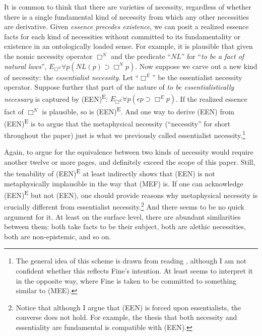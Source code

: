 \documentclass[12pt]{article}
\begin{document}
\par
It is common to think that there are varieties of necessity, regardless of whether there is a single fundamental kind of necessity from which any other necessities are derivative. Given \textit{essence precedes existence}, we can posit a realized essence facts for each kind of necessities without committed to its fundamentality or existence in an ontologically loaded sense. For example, it is plausible that given the nomic necessity operator $\Box^N$ and the predicate ``$NL$'' for ``\textit{to be a fact of natural laws}'', $E_{\Box^N} \forall p (NL(p) \supset \Box^N p)$. Now suppose we carve out a new kind of necessity: the \textit{essentialist necessity}. Let ``$\Box^E$'' be the essentialist necessity operator. Suppose further that part of the nature of \textit{to be essentialistically necessary} is captured by (EEN)\textsuperscript{E}: $E_{\Box^E} \forall p(\epsilon p \supset \Box^E p)$. If the realized essence fact of $\Box^N$ is plausible, so is (EEN)\textsuperscript{E}. And one way to derive (EEN) from (EEN)\textsuperscript{E} is to argue that the metaphysical necessity (``necessity'' for short throughout the paper) just is what we previously called essentialist necessity.\footnote{The general idea of this scheme is drawn from reading \citet[463--4]{Fine2020-Reply}, although I am not confident whether this reflects Fine's intention. At least \citet{Romero2023-CAROEN} seems to interpret it in the opposite way, where Fine is taken to be committed to something similar to (MEE).} 
\par
Again, to argue for the equivalence between two kinds of necessity would require another twelve or more pages, and definitely exceed the scope of this paper. Still, the tenability of (EEN)\textsuperscript{E} at least indirectly shows that (EEN) is not metaphysically implausible in the way that (MEF) is. If one can acknowledge (EEN)\textsuperscript{E} but not (EEN), one should provide reasons why metaphysical necessity is crucially different from essentialist necessity.\footnote{Notice that although I argue that (EEN) is forced upon essentialists, the converse does not hold. For example, the thesis that both necessity and essentiality are fundamental is compatible with (EEN).} And there seems to be no quick argument for it. At least on the surface level, there are abundant similarities between them: both take facts to be their subject, both are alethic necessities, both are non-epistemic, and so on. 
\par
\end{document}
